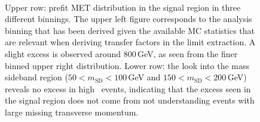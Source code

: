 \begin{figure}
  \\
\caption{Upper row: prefit MET distribution in the signal region in three different binnings. The upper left figure corresponds to the analysis binning that has been derived given the available MC statistics that are relevant when deriving transfer factors in the limit extraction. A slight excess is observed around 800\,GeV, as seen from the finer binned upper right distribution. Lower row: the look into the mass sideband region ($50<m_\text{SD}<100$\,GeV and $150<m_\text{SD}<200$\,GeV) reveals no excess in high \ptmiss~events, indicating that the excess seen in the signal region does not come from not understanding events with large missing transverse momentum.}
\label{Fig_sr}
\end{figure}






